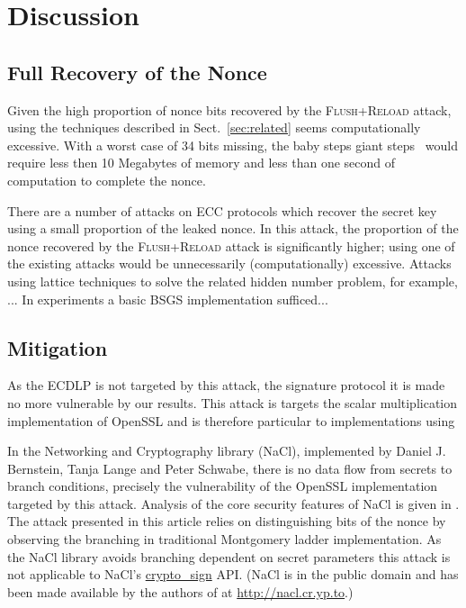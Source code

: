 \documentclass{llncs}
\begin{document}
\section{Discussion}\label{sec:discussion}

\subsection{Full Recovery of the Nonce}\label{sub:full_nonce}
Given the high proportion of nonce bits recovered by the \textsc{Flush+Reload} attack, using the techniques
described in Sect.~\ref{sec:related} seems computationally excessive. 
With a worst case of 34 bits missing, the baby steps giant steps~\cite{shanks71class} would require less then 10 Megabytes of memory
and less than one second of computation to complete the nonce.

There are a number of attacks on ECC protocols which recover the secret key using a small proportion of the leaked nonce. In this attack, the proportion of the nonce recovered by the \textsc{Flush+Reload} attack is significantly higher; using one of the existing attacks would be unnecessarily (computationally) excessive. Attacks using lattice techniques to solve the related hidden number problem, for example, ... 
In experiments a basic BSGS implementation sufficed... 




\subsection*{Mitigation}
As the ECDLP is not targeted by this attack, the signature protocol it is made no more vulnerable by our results. This attack is targets the scalar multiplication implementation of OpenSSL and is therefore particular to implementations using 

In the Networking and Cryptography library (NaCl), implemented by Daniel J. Bernstein, Tanja Lange and Peter Schwabe, there is no data flow from secrets to branch conditions, precisely the vulnerability of the OpenSSL implementation targeted by this attack. Analysis of the core security features of NaCl is given in \cite{dan-tan-peter} . The attack presented in this article relies on distinguishing bits of the nonce by observing the branching in traditional Montgomery ladder implementation. As the NaCl library avoids branching dependent on secret parameters this attack is not applicable to NaCl's \url{crypto_sign} API. (NaCl is in the public domain and has been made available by the authors of \cite{dan-tan-peter} at \url{http://nacl.cr.yp.to}.)
\end{document}
